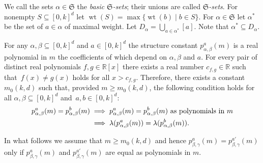 \documentclass[10pt]{article}
\newcommand{\fS}{\mathfrak S}
\newcommand{\wt}{\operatorname{wt}}
\renewcommand{\subset}{\subseteq}
\begin{document}
We call the sets $\alpha \in \fS$ the \emph{basic $\fS$-sets};
their unions are called \emph{$\fS$-sets}.
For nonempty $S \subseteq [0,k]^d$ let $\wt(S) = \max\{\wt(b) \mid b \in S\}$.
For $\alpha \in \fS$ let $\alpha^*$ be the set of $a \in \alpha$ of maximal weight.
Let $D_\alpha = \bigcup_{a \in \alpha^*} [a]$. Note that $\alpha^*\subseteq D_\alpha$.


{For any $\alpha,\beta\subseteq [0,k]^d$ and $a\in [0,k]^d$ the structure constant $p_{\alpha,\beta}^a(m)$ is a real polynomial in $m$ the coefficients of which depend on $\alpha,\beta$ and $a$. For every pair of distinct real polynomials $f,g\in \mathbb{R}[x]$ there exists a real number $c_{f,g}\in\mathbb{R}$ such that~$f(x)\neq g(x)$ holds for all $x > c_{f,g}$. Therefore, there exists a constant $m_0(k,d)$ such that, provided $m \geq m_0(k, d)$, the following condition holds for all $\alpha,\beta\subset [0,k]^d$ and~$a,b\in [0,k]^d$:
\begin{align}\label{poly}
    p_{\alpha,\beta}^a(m) = p_{\alpha,\beta}^b(m)
    &\implies p_{\alpha,\beta}^a(m) = p_{\alpha,\beta}^b(m)\text{ as polynomials in } m \\
    \notag &\implies \lambda(p_{\alpha,\beta}^a(m)) = \lambda(p_{\alpha,\beta}^b(m)).
\end{align}}

{In what follows we assume that $m \geq m_0(k, d)$ and hence $p^a_{\beta,\gamma}(m) = p^{a'}_{\beta,\gamma}(m)$ only if $p^a_{\beta,\gamma}(m)$ and $p^{a'}_{\beta,\gamma}(m)$ are equal as polynomials in $m$.}
\end{document}
